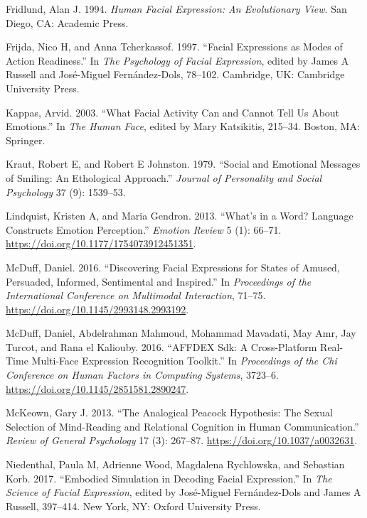 \documentclass[conference,final,]{IEEEtran}
\begin{document}
\leavevmode\hypertarget{ref-fridlund1994human}{}%
Fridlund, Alan J. 1994. \emph{Human Facial Expression: An Evolutionary
View}. San Diego, CA: Academic Press.

\leavevmode\hypertarget{ref-frijda1997facial}{}%
Frijda, Nico H, and Anna Tcherkassof. 1997. ``Facial Expressions as
Modes of Action Readiness.'' In \emph{The Psychology of Facial
Expression}, edited by James A Russell and José-Miguel Fernández-Dols,
78--102. Cambridge, UK: Cambridge University Press.

\leavevmode\hypertarget{ref-kappas2003facial}{}%
Kappas, Arvid. 2003. ``What Facial Activity Can and Cannot Tell Us About
Emotions.'' In \emph{The Human Face}, edited by Mary Katsikitis,
215--34. Boston, MA: Springer.

\leavevmode\hypertarget{ref-kraut1979social}{}%
Kraut, Robert E, and Robert E Johnston. 1979. ``Social and Emotional
Messages of Smiling: An Ethological Approach.'' \emph{Journal of
Personality and Social Psychology} 37 (9): 1539--53.

\leavevmode\hypertarget{ref-lindquist2013s}{}%
Lindquist, Kristen A, and Maria Gendron. 2013. ``What's in a Word?
Language Constructs Emotion Perception.'' \emph{Emotion Review} 5 (1):
66--71. \url{https://doi.org/10.1177/1754073912451351}.

\leavevmode\hypertarget{ref-mcduff2016discovering}{}%
McDuff, Daniel. 2016. ``Discovering Facial Expressions for States of
Amused, Persuaded, Informed, Sentimental and Inspired.'' In
\emph{Proceedings of the International Conference on Multimodal
Interaction}, 71--75. \url{https://doi.org/10.1145/2993148.2993192}.

\leavevmode\hypertarget{ref-mcduff2016affdex}{}%
McDuff, Daniel, Abdelrahman Mahmoud, Mohammad Mavadati, May Amr, Jay
Turcot, and Rana el Kaliouby. 2016. ``AFFDEX Sdk: A Cross-Platform
Real-Time Multi-Face Expression Recognition Toolkit.'' In
\emph{Proceedings of the Chi Conference on Human Factors in Computing
Systems}, 3723--6. \url{https://doi.org/10.1145/2851581.2890247}.

\leavevmode\hypertarget{ref-mckeown2013analogical}{}%
McKeown, Gary J. 2013. ``The Analogical Peacock Hypothesis: The Sexual
Selection of Mind-Reading and Relational Cognition in Human
Communication.'' \emph{Review of General Psychology} 17 (3): 267--87.
\url{https://doi.org/10.1037/a0032631}.

\leavevmode\hypertarget{ref-niedenthal2017embodied}{}%
Niedenthal, Paula M, Adrienne Wood, Magdalena Rychlowska, and Sebastian
Korb. 2017. ``Embodied Simulation in Decoding Facial Expression.'' In
\emph{The Science of Facial Expression}, edited by José-Miguel
Fernández-Dols and James A Russell, 397--414. New York, NY: Oxford
University Press.
\end{document}
